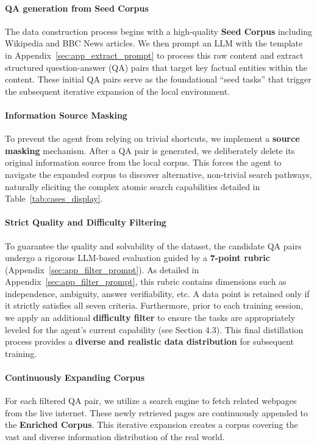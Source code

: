 \documentclass{article} %
\theoremstyle{plain}
\theoremstyle{definition}
\theoremstyle{remark}
\begin{document}
\paragraph{QA generation from Seed Corpus} 
The data construction process begins with a high-quality \textbf{Seed Corpus} including Wikipedia and BBC News articles. We then prompt an LLM with the template in Appendix~\ref{sec:app_extract_prompt}
 to process this raw content and extract structured question-answer (QA) pairs that target key factual entities within the content. These initial QA pairs serve as the foundational ``seed tasks'' that trigger the subsequent iterative expansion of the local environment.

\paragraph{Information Source Masking} 
To prevent the agent from relying on trivial shortcuts, we implement a \textbf{source masking} mechanism. After a QA pair is generated, we deliberately delete its original information source from the local corpus. This forces the agent to navigate the expanded corpus to discover alternative, non-trivial search pathways, naturally eliciting the complex atomic search capabilities detailed in Table~\ref{tab:cases_display}.

\paragraph{Strict Quality and Difficulty Filtering} 
To guarantee the quality and solvability of the dataset, the candidate QA pairs undergo a rigorous LLM-based evaluation guided by a \textbf{7-point rubric} (Appendix~\ref{sec:app_filter_prompt}). As detailed in Appendix~\ref{sec:app_filter_prompt}, this rubric contains dimensions such as independence, ambiguity, answer verifiability, etc. A data point is retained only if it strictly satisfies all seven criteria. Furthermore, prior to each training session, we apply an additional \textbf{difficulty filter} to ensure the tasks are appropriately leveled for the agent's current capability (see Section 4.3). This final distillation process provides a \textbf{diverse and realistic data distribution} for subsequent training.

\paragraph{Continuously Expanding Corpus} 
For each filtered QA pair, we utilize a search engine to fetch related webpages from the live internet. These newly retrieved pages are continuously appended to the \textbf{Enriched Corpus}. This iterative expansion creates a corpus covering the vast and diverse information distribution of the real world.
\end{document}
